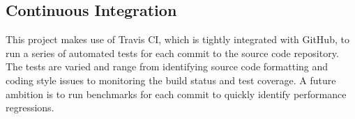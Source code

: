 
\subsection{Continuous Integration}
\label{sec:ver_continuous_integration}

This project makes use of Travis CI, which is tightly integrated with GitHub, to run a series of automated tests for each commit to the source code repository. The tests are varied and range from identifying source code formatting and coding style issues to monitoring the build status and test coverage. A future ambition is to run benchmarks for each commit to quickly identify performance regressions.








